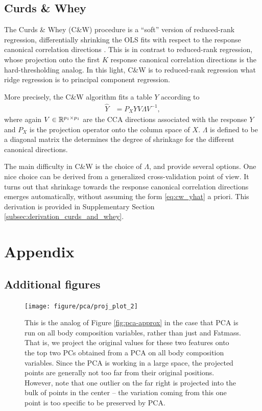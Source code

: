 \documentclass{article}
\begin{document}
\subsection{Curds \& Whey}
\label{subsec:cw}

The Curds \& Whey (C\&W) procedure is a ``soft'' version of reduced-rank
regression, differentially shrinking the OLS fits with respect to the response
canonical correlation directions \citep{breiman1997predicting}. This is in
contrast to reduced-rank regression, whose projection onto the first $K$
response canonical correlation directions is the hard-thresholding analog. In
this light, C\&W is to reduced-rank regression what ridge regression is to
principal component regression.

More precisely, the C\&W algorithm fits a table $Y$ according to
\begin{align}
  \hat{Y} &= P_{X}YV\Lambda V^{-1}, \label{eq:cw_yhat}
\end{align}
where again $V \in \mathbb{R}^{p_{1} \times p_{1}}$ are the CCA directions
associated with the response $Y$ and $P_{X}$ is the projection operator onto the
column space of $X$. $\Lambda$ is defined to be a diagonal matrix the determines
the degree of shrinkage for the different canonical directions.

The main difficulty in C\&W is the choice of $\Lambda$, and
\citep{breiman1997predicting} provide several options. One nice choice can be
derived from a generalized cross-validation point of view. It turns out that
shrinkage towards the response canonical correlation directions emerges
automatically, without assuming the form \ref{eq:cw_yhat} a priori. This
derivation is provided in Supplementary Section
\ref{subsec:derivation_curds_and_whey}.




\section{Appendix}

\subsection{Additional figures}

\begin{figure}
  \texttt{[image: figure/pca/proj\_plot\_2]}
  \caption{This is the analog of Figure \ref{fig:pca-approx} in the case that
    PCA is run on all body composition variables, rather than just  and
    Fatmass. That is, we project the original values for these two features
    onto the top two PCs obtained from a PCA on all body composition variables.
    Since the PCA is working in a large space, the projected points are
    generally not too far from their original positions. However, note that one
    outlier on the far right is projected into the bulk of points in the center
    -- the variation coming from this one point is too specific to be preserved
    by PCA.
  \label{fig:pca-approx-2}}
\end{figure}
\end{document}
